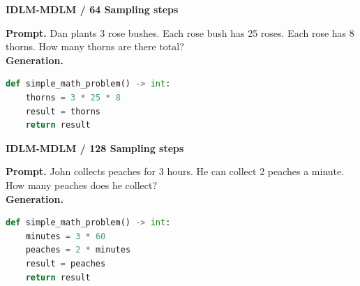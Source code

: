\begin{tcolorbox}
\par\vspace{1.0mm}
\noindent
\begin{minipage}[t]{0.31\linewidth}
{\footnotesize\bfseries\textcolor{tinyorange}{IDLM-MDLM / 64 Sampling steps}}\\[-0.1mm]
\end{minipage}\hfill
\begin{minipage}[t]{0.66\linewidth}
{\scriptsize\bfseries Prompt.}
{\scriptsize Dan plants 3 rose bushes. Each rose bush has 25 roses. Each rose has 8 thorns. How many thorns are there total?}\\[-0.1mm]
{\scriptsize\bfseries Generation.}\\[-2.4mm]
\begin{lstlisting}[language=Python,basicstyle=\ttfamily\tiny,columns=fullflexible,keepspaces=true,breaklines=true,aboveskip=0pt,belowskip=0pt,xleftmargin=0.04\linewidth,xrightmargin=0.04\linewidth]
def simple_math_problem() -> int:
    thorns = 3 * 25 * 8
    result = thorns
    return result
\end{lstlisting}
\end{minipage}

\par\vspace{1.0mm}
\noindent
\begin{minipage}[t]{0.31\linewidth}
{\footnotesize\bfseries\textcolor{tinyorange}{IDLM-MDLM / 128 Sampling steps}}\\[-0.1mm]
\end{minipage}\hfill
\begin{minipage}[t]{0.66\linewidth}
{\scriptsize\bfseries Prompt.}
{\scriptsize John collects peaches for 3 hours. He can collect 2 peaches a minute. How many peaches does he collect?}\\[-0.1mm]
{\scriptsize\bfseries Generation.}\\[-2.4mm]
\begin{lstlisting}[language=Python,basicstyle=\ttfamily\tiny,columns=fullflexible,keepspaces=true,breaklines=true,aboveskip=0pt,belowskip=0pt,xleftmargin=0.04\linewidth,xrightmargin=0.04\linewidth]
def simple_math_problem() -> int:
    minutes = 3 * 60
    peaches = 2 * minutes
    result = peaches
    return result
\end{lstlisting}
\end{minipage}


\end{tcolorbox}
